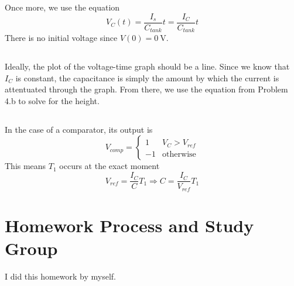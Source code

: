 \documentclass[]{article}
\begin{document}
Once more, we use the equation
\begin{equation}
	V_C(t) = \frac{I_s}{C_{tank}}t = \frac{I_C}{C_{tank}}t
\end{equation}
There is no initial voltage since \(V(0) = \SI{0}{\volt}\). 

\subsection{}

Ideally, the plot of the voltage-time graph should be a line. 
Since we know that \(I_C\) is constant, the capacitance is simply the amount by which the current is attentuated through the graph. 
From there, we use the equation from Problem 4.b to solve for the height. 

\subsection{}

In the case of a comparator, its output is 
\begin{equation}
	V_{comp} = 
	\begin{cases}
	1 & V_{C} > V_{ref} \\
	-1 & \text{otherwise}
	\end{cases}
\end{equation}
This means \(T_1\) occurs at the exact moment
\begin{equation}
	V_{ref} = \frac{I_C}{C} T_1 \Longrightarrow C = \frac{I_C}{V_{ref}}T_1
\end{equation}


\section{Homework Process and Study Group}

I did this homework by myself. 

\newpage

%
\end{document}
